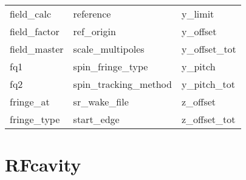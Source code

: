 \begin{tabular}{lll}
field_calc                  & reference                   & y_limit                     \\
field_factor                & ref_origin                  & y_offset                    \\
field_master                & scale_multipoles            & y_offset_tot                \\
fq1                         & spin_fringe_type            & y_pitch                     \\
fq2                         & spin_tracking_method        & y_pitch_tot                 \\
fringe_at                   & sr_wake_file                & z_offset                    \\
fringe_type                 & start_edge                  & z_offset_tot                \\
 \bottomrule
 \end{tabular}
 \vfill
 
 \section{RFcavity}
 \label{s:list.rfcavity}
 
